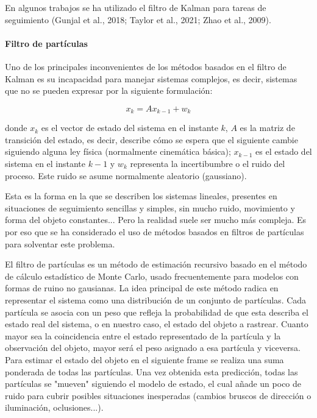 En algunos trabajos se ha utilizado el filtro de Kalman para tareas de seguimiento (Gunjal et al.,
2018; Taylor et al., 2021; Zhao et al., 2009).

\paragraph{Filtro de partículas}
Uno de los principales inconvenientes de los métodos basados en el filtro de Kalman es su incapacidad para manejar sistemas complejos, es decir, sistemas que no se pueden expresar por la siguiente formulación:

\begin{equation}
    x_k = A x_{k-1} + w_k
\end{equation}

donde $x_k$ es el vector de estado del sistema en el instante $k$, $A$ es la matriz de transición del estado, es decir, describe cómo se espera que el siguiente cambie siguiendo alguna ley física (normalmente cinemática básica); $x_{k-1}$ es el estado del sistema en el instante $k-1$ y $w_k$ representa la incertibumbre o el ruido del proceso. Este ruido se asume normalmente aleatorio (gaussiano). 

Esta es la forma en la que se describen los sistemas lineales, presentes en situaciones de seguimiento sencillas y simples, sin mucho ruido, movimiento y forma del objeto constantes... Pero la realidad suele ser mucho más compleja. Es por eso que se ha considerado el uso de métodos basados en filtros de partículas para solventar este problema. 

El filtro de partículas es un método de estimación recursivo basado en el método de cálculo estadístico de Monte Carlo, usado frecuentemente para modelos con formas de ruino no gausianas. La idea principal de este método radica en representar el sistema como una distribución de un conjunto de partículas. Cada partícula se asocia con un peso que refleja la probabilidad de que esta describa el estado real del sistema, o en nuestro caso, el estado del objeto a rastrear. Cuanto mayor sea la coincidencia entre el estado representado de la partícula y la observación del objeto, mayor será el peso asignado a esa partícula y viceversa. Para estimar el estado del objeto en el siguiente frame se realiza una suma ponderada de todas las partículas. Una vez obtenida esta predicción, todas las partículas se "mueven" siguiendo el modelo de estado, el cual añade un poco de ruido para cubrir posibles situaciones inesperadas (cambios bruscos de dirección o iluminación, oclusiones...). 

